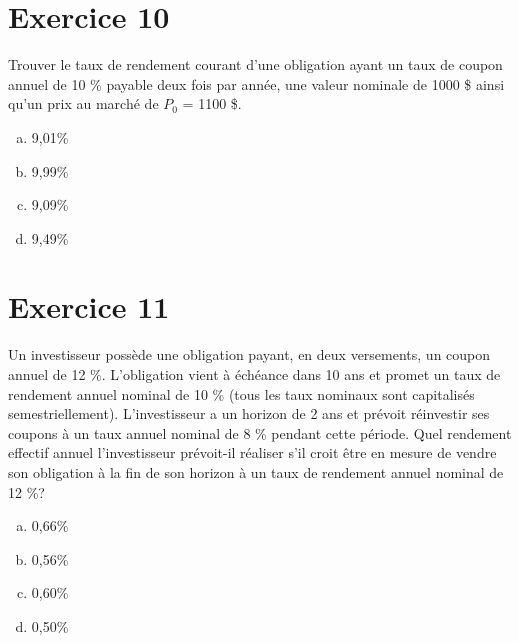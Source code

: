 \documentclass[10pt,a4paper]{article}
\begin{document}
\section*{Exercice 10}
Trouver le taux de rendement courant d'une obligation ayant un taux de coupon annuel de 10 \% payable deux fois par année, une valeur nominale de 1000 \$ ainsi qu'un prix au marché de $P_0$  = 1100 \$.

\begin{enumerate}[a)]
\item 9,01\%
\item 9,99\%
\item 9,09\%
\item 9,49\%
\end{enumerate}

\newpage

\section*{Exercice 11}
Un investisseur possède une obligation payant, en deux versements, un coupon annuel de 12 \%.  L’obligation vient à échéance dans 10 ans et promet un taux de rendement annuel nominal de 10 \% (tous les taux nominaux sont capitalisés semestriellement).  L’investisseur a un horizon de 2 ans et prévoit réinvestir ses coupons à un taux annuel nominal de 8 \% pendant cette période.  Quel rendement effectif annuel l’investisseur prévoit-il réaliser s’il croit être en mesure de vendre son obligation à la fin de son horizon à un taux de rendement annuel nominal de 12 \%?

\begin{enumerate}[a)]
\item 0,66\%
\item 0,56\%
\item 0,60\%
\item 0,50\%
\end{enumerate}
\end{document}
